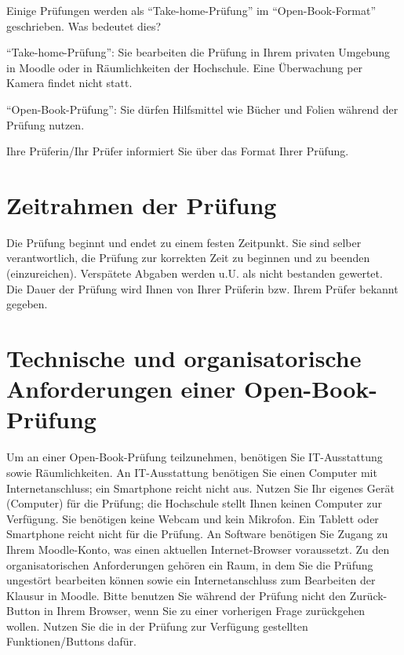 \documentclass[
  a4paper,
  DIV=11]{scrreprt}
\theoremstyle{definition}
\theoremstyle{remark}
\begin{document}
Einige Prüfungen werden als ``Take-home-Prüfung'' im
``Open-Book-Format'' geschrieben. Was bedeutet dies?

``Take-home-Prüfung'': Sie bearbeiten die Prüfung in Ihrem privaten
Umgebung in Moodle oder in Räumlichkeiten der Hochschule. Eine
Überwachung per Kamera findet nicht statt.

``Open-Book-Prüfung'': Sie dürfen Hilfsmittel wie Bücher und Folien
während der Prüfung nutzen.

Ihre Prüferin/Ihr Prüfer informiert Sie über das Format Ihrer Prüfung.

\hypertarget{zeitrahmen-der-pruxfcfung}{%
\section{Zeitrahmen der Prüfung}\label{zeitrahmen-der-pruxfcfung}}

Die Prüfung beginnt und endet zu einem festen Zeitpunkt. Sie sind selber
verantwortlich, die Prüfung zur korrekten Zeit zu beginnen und zu
beenden (einzureichen). Verspätete Abgaben werden u.U. als nicht
bestanden gewertet. Die Dauer der Prüfung wird Ihnen von Ihrer Prüferin
bzw. Ihrem Prüfer bekannt gegeben.

\hypertarget{technische-und-organisatorische-anforderungen-einer-open-book-pruxfcfung}{%
\section{Technische und organisatorische Anforderungen einer
Open-Book-Prüfung}\label{technische-und-organisatorische-anforderungen-einer-open-book-pruxfcfung}}

Um an einer Open-Book-Prüfung teilzunehmen, benötigen Sie IT-Ausstattung
sowie Räumlichkeiten. An IT-Ausstattung benötigen Sie einen Computer mit
Internetanschluss; ein Smartphone reicht nicht aus. Nutzen Sie Ihr
eigenes Gerät (Computer) für die Prüfung; die Hochschule stellt Ihnen
keinen Computer zur Verfügung. Sie benötigen keine Webcam und kein
Mikrofon. Ein Tablett oder Smartphone reicht nicht für die Prüfung. An
Software benötigen Sie Zugang zu Ihrem Moodle-Konto, was einen aktuellen
Internet-Browser voraussetzt. Zu den organisatorischen Anforderungen
gehören ein Raum, in dem Sie die Prüfung ungestört bearbeiten können
sowie ein Internetanschluss zum Bearbeiten der Klausur in Moodle. Bitte
benutzen Sie während der Prüfung nicht den Zurück-Button in Ihrem
Browser, wenn Sie zu einer vorherigen Frage zurückgehen wollen. Nutzen
Sie die in der Prüfung zur Verfügung gestellten Funktionen/Buttons
dafür.
\end{document}
